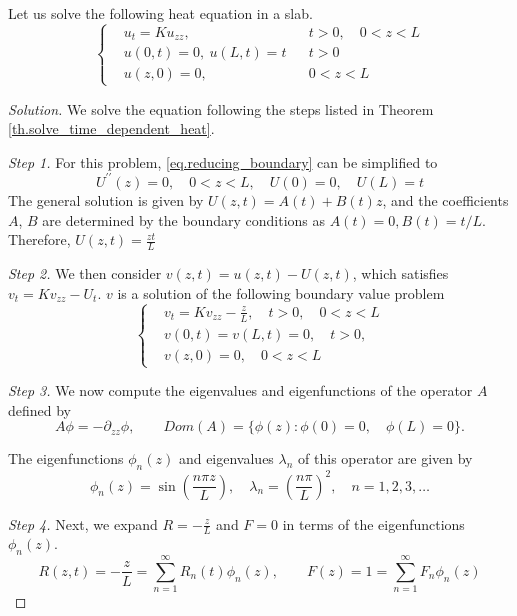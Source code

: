 \begin{example}
    Let us solve the following heat equation in a slab.
    \begin{equation}
        \left\{
        \begin{aligned}
            &u_t=K u_{z z},\quad && t>0, \quad 0<z<L \\
            &u(0, t)=0,\ u(L, t)=t && t>0 \\
            &u(z, 0)=0,\quad && 0<z<L
        \end{aligned}
        \right.
    \end{equation}
\end{example}
\begin{proof}[Solution] We solve the equation following the steps listed in Theorem \ref{th.solve_time_dependent_heat}.

\textit{Step 1.} For this problem, \eqref{eq.reducing_boundary} can be simplified to 
$$
U^{\prime \prime}(z)=0, \quad 0<z<L, \quad U(0)=0, \quad U(L)=t
$$
The general solution is given by $U(z, t)=A(t)+B(t)z$, and the coefficients $A$, $B$ are determined by the boundary conditions as $A(t)=0, B(t)=t/L$. Therefore, $U(z, t)=\frac{zt}{L}$
    
\textit{Step 2.} We then consider $v(z, t)=u(z, t)-U(z, t)$, which satisfies $v_t = Kv_{zz} - U_t$. $v$ is a solution of the following boundary value problem
\begin{equation}\label{eq.sol_ex_time_independent_0}
    \left\{\begin{aligned}
    & v_t=K v_{z z} - \frac{z}{L}, \quad t>0, \quad 0<z<L 
    \\
    & v(0, t)=v(L, t)=0, \quad t>0, 
    \\
    &v(z, 0)=0, \quad 0<z<L
    \end{aligned}\right.
\end{equation}

\textit{Step 3.} We now compute the eigenvalues and eigenfunctions of the operator $A$ defined by
\[
    A \phi = -\partial_{zz} \phi,\qquad \textit{Dom}(A) = \{\phi(z): \phi(0) = 0, \quad \phi(L) = 0\}.
\]

The eigenfunctions $\phi_n(z)$ and eigenvalues $\lambda_n$ of this operator are given by
\[
    \phi_n(z) = \sin\left( \frac{n \pi z}{L} \right), \quad \lambda_n = \left( \frac{n \pi}{L} \right)^2, \quad n = 1, 2, 3, \dots
\]

\textit{Step 4.} Next, we expand $R = -\frac{z}{L}$ and $F = 0$ in terms of the eigenfunctions $\phi_n(z)$. 
\begin{equation}\label{eq.sol_ex_time_independent_1}
    R(z, t) = -\frac{z}{L} = \sum_{n=1}^\infty R_n(t) \phi_n(z),\qquad F(z) = 1 = \sum_{n=1}^\infty F_n \phi_n(z)
\end{equation}


\end{proof}
